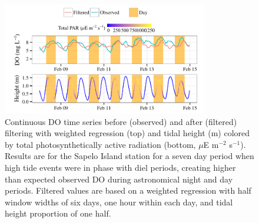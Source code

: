 \documentclass[letterpaper,12pt,oneside]{article}\usepackage[]{graphicx}\usepackage[]{color}
\newenvironment{knitrout}{}{} %
\begin{document}
\centering\vspace*{\fill}
\begin{knitrout}
\color{fgcolor}\begin{figure}[!ht]


{\centering \includegraphics[width=0.8\textwidth]{figure/phase_in} 

}

\caption[Continuous \ac{DO} time series before (observed) and after (filtered) filtering with weighted regression (top) and tidal height (m) colored by total photosynthetically active radiation (bottom, $\mu$E m$^{-2}$ s$^{-1}$)]{Continuous \ac{DO} time series before (observed) and after (filtered) filtering with weighted regression (top) and tidal height (m) colored by total photosynthetically active radiation (bottom, $\mu$E m$^{-2}$ s$^{-1}$). Results are for the Sapelo Island station for a seven day period when high tide events were in phase with diel periods, creating higher than expected observed \ac{DO} during astronomical night and day periods. Filtered values are based on a weighted regression with half window widths of six days, one hour within each day, and tidal height proportion of one half.\label{fig:phase_in}}
\end{figure}


\end{knitrout}
\vfill
\clearpage
\end{document}
